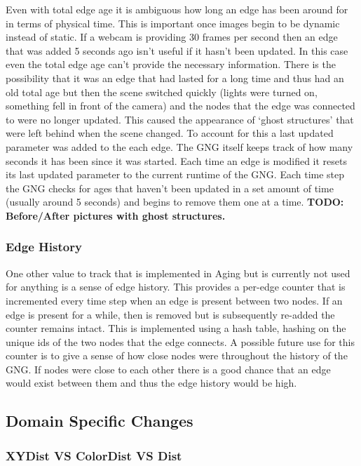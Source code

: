 \documentclass{article}
\renewcommand{\|}{\origbar} %
\begin{document}
Even with total edge age it is ambiguous how long an edge has been around for in terms of physical time. This is important once images begin to be dynamic instead of static. If a webcam is providing 30 frames per second then an edge that was added 5 seconds ago isn't useful if it hasn't been updated. In this case even the total edge age can't provide the necessary information. There is the possibility that it was an edge that had lasted for a long time and thus had an old total age but then the scene switched quickly (lights were turned on, something fell in front of the camera) and the nodes that the edge was connected to were no longer updated. This caused the appearance of `ghost structures' that were left behind when the scene changed. To account for this a last updated parameter was added to the each edge. The GNG itself keeps track of how many seconds it has been since it was started. Each time an edge is modified it resets its last updated parameter to the current runtime of the GNG. Each time step the GNG checks for ages that haven't been updated in a set amount of time (usually around 5 seconds) and begins to remove them one at a time. {\bf TODO: Before/After pictures with ghost structures.}

\subsubsection{Edge History}

One other value to track that is implemented in Aging but is currently not used for anything is a sense of edge history. This provides a per-edge counter that is incremented every time step when an edge is present between two nodes. If an edge is present for a while, then is removed but is subsequently re-added the counter remains intact. This is implemented using a hash table, hashing on the unique ids of the two nodes that the edge connects. A possible future use for this counter is to give a sense of how close nodes were throughout the history of the GNG. If nodes were close to each other there is a good chance that an edge would exist between them and thus the edge history would be high.

\subsection{Domain Specific Changes}

\subsubsection{XYDist VS ColorDist VS Dist}
\end{document}
